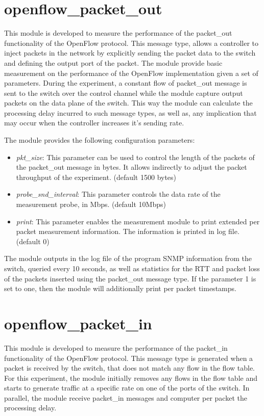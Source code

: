 \documentclass{book}
\begin{document}
  \section{openflow\_packet\_out}

  This module is developed to measure the performance of the packet\_out
  functionality of the OpenFlow protocol. This message type, allows a
  controller to inject packets in the network by explicitly sending the packet
  data to the switch and defining the output port of the packet. The module
  provide basic measurement on the performance of the OpenFlow implementation
  given a set of parameters. During the experiment, a constant flow of packet\_out
  message is sent to the switch over
  the control channel while the module capture output packets on the data plane of the
  switch. This way the module can calculate the processing delay incurred to such
  message types, as well as, any implication that may occur when the controller
  increases it's sending rate. 

  The module provides the following configuration parameters:
  \begin{itemize}
  \item \emph{pkt\_size}:  This parameter can be used to control the length of the
  packets of the packet\_out message in bytes. It allows indirectly to adjust the packet
throughput of the experiment. (default 1500 bytes)
  \item \emph{probe\_snd\_interval}: This parameter controls the data rate of the 
measurement probe, in Mbps. (default 10Mbps)
  \item \emph{print}: This parameter enables the measurement module to print
  extended per packet measurement information. The information is printed in log
file. (default 0)
  \end{itemize}

  The module outputs in the log file of the program SNMP information from the switch, queried
  every 10 seconds, as well as statistics for the RTT and packet loss of the
  packets inserted using the packet\_out message type. If the parameter 1 is set
  to one, then the module will additionally print per packet timestamps. 

  \section{openflow\_packet\_in}

  This module is developed to measure the performance of the packet\_in
  functionality of the OpenFlow protocol. This message type is generated when a
  packet is received by the switch, that does not match any flow in the flow
  table. For this experiment, the module initially removes any flows in the flow table and starts
  to generate traffic at a specific rate on one of the ports of the switch. 
  In parallel, the module receive packet\_in messages and computer per packet the
  processing delay.
\end{document}

